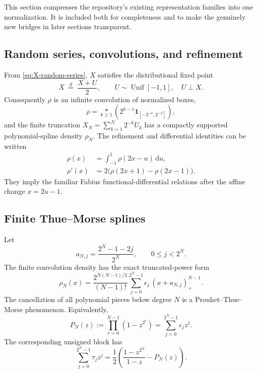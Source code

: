 \documentclass[11pt,oneside]{article}
\theoremstyle{definition}
\newcommand{\dd}{\,\mathrm d}
\begin{document}
This section compresses the repository's existing representation families into one
normalization. It is included both for completeness and to make the genuinely new bridges
in later sections transparent.

\subsection{Random series, convolutions, and refinement}

From \eqref{eq:X-random-series}, \(X\) satisfies the distributional fixed point
\begin{equation}
 X\ \stackrel d=\ \frac{X+U}{2},
 \qquad U\sim\operatorname{Unif}[-1,1],\quad U\perp X.
 \label{eq:distribution-fixed-point}
\end{equation}
Consequently \(\rho\) is an infinite convolution of normalized boxes,
\begin{equation}
 \rho=\underset{k\ge1}{*}\left(2^{k-1}\mathbf1_{[-2^{-k},2^{-k}]}\right),
 \label{eq:infinite-convolution}
\end{equation}
and the finite truncation \(X_N=\sum_{k=1}^{N}2^{-k}U_k\) has a compactly supported
polynomial-spline density \(\rho_N\). The refinement and differential identities can be
written
\begin{align}
 \rho(x)&=\int_{-1}^{1}\rho(2x-u)\dd u,
 \label{eq:rho-refinement}\\
 \rho'(x)&=2\bigl(\rho(2x+1)-\rho(2x-1)\bigr).
 \label{eq:rho-differential}
\end{align}
They imply the familiar Fabius functional-differential relations after the affine change
\(x=2u-1\).

\subsection{Finite Thue--Morse splines}

Let
\[
 a_{N,j}=\frac{2^N-1-2j}{2^N},\qquad 0\le j<2^N.
\]
The finite convolution density has the exact truncated-power form
\begin{equation}
 \rho_N(x)=\frac{2^{N(N-1)/2}}{(N-1)!}
 \sum_{j=0}^{2^N-1}\epsilon_j\,(x+a_{N,j})_+^{N-1}.
 \label{eq:finite-spline}
\end{equation}
The cancellation of all polynomial pieces below degree \(N\) is a Prouhet--Thue--Morse
phenomenon. Equivalently,
\begin{equation}
 P_N(z):=\prod_{r=0}^{N-1}(1-z^{2^r})
 =\sum_{j=0}^{2^N-1}\epsilon_j z^j.
 \label{eq:finite-TM-product}
\end{equation}
The corresponding unsigned block has
\begin{equation}
 \sum_{j=0}^{2^N-1}\tau_j z^j
 =\frac12\left(\frac{1-z^{2^N}}{1-z}-P_N(z)\right).
 \label{eq:unsigned-finite-product}
\end{equation}
\end{document}
